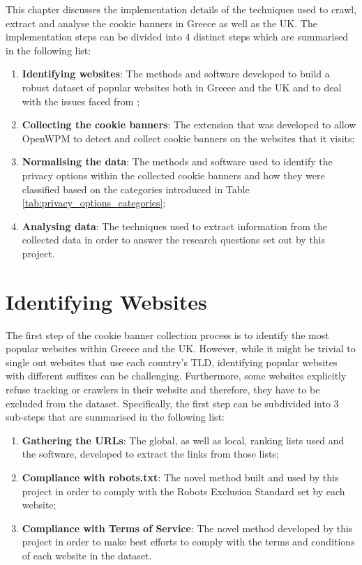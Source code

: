 \documentclass[../main.tex]{subfiles}
\begin{document}
This chapter discusses the implementation details of the techniques used to crawl, extract and analyse the cookie banners in Greece as well as the UK. The implementation steps can be divided into 4 distinct steps which are summarised in the following list:

\begin{enumerate}
    \item \textbf{Identifying websites}: The methods and software developed to build a robust dataset of popular websites both in Greece and the UK and to deal with the issues faced from ;
    
    \item \textbf{Collecting the cookie banners}: The extension that was developed to allow OpenWPM to detect and collect cookie banners on the websites that it visits;
    
    \item \textbf{Normalising the data}: The methods and software used to identify the privacy options within the collected cookie banners and how they were classified based on the categories introduced in Table \ref{tab:privacy_options_categories};
    
    \item \textbf{Analysing data}: The techniques used to extract information from the collected data in order to answer the research questions set out by this project.
\end{enumerate}

\section{Identifying Websites}
The first step of the cookie banner collection process is to identify the most popular websites within Greece and the UK. However, while it might be trivial to single out websites that use each country’s TLD, identifying popular websites with different suffixes can be challenging. Furthermore, some websites explicitly refuse tracking or crawlers in their website and therefore, they have to be excluded from the dataset. Specifically, the first step can be subdivided into 3 sub-steps that are summarised in the following list:

\begin{enumerate}
    \item \textbf{Gathering the URLs}: The global, as well as local, ranking lists used and the software, developed to extract the links from those lists;
    
    \item \textbf{Compliance with robots.txt}: The novel method built and used by this project in order to comply with the Robots Exclusion Standard set by each website;
    
    \item \textbf{Compliance with Terms of Service}: The novel method developed by this project in order to make best efforts to comply with the terms and conditions of each website in the dataset.
\end{enumerate}
\end{document}
